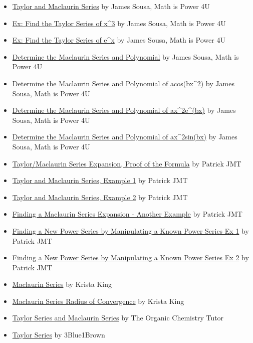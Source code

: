 \begin{itemize}
    \item \href{https://www.youtube.com/watch?v=cwpJxfHkR1o}{Taylor and Maclaurin Series} by James Sousa, Math is Power 4U
    \item \href{https://www.youtube.com/watch?v=jKq-TdR9GG8}{Ex: Find the Taylor Series of x^3} by James Sousa, Math is Power 4U
    \item \href{https://www.youtube.com/watch?v=vzn7EdBQgBk}{Ex: Find the Taylor Series of e^x} by James Sousa, Math is Power 4U
    \item \href{https://www.youtube.com/watch?v=Zt7QQt-3-xA}{Determine the Maclaurin Series and Polynomial} by James Sousa, Math is Power 4U
    \item \href{https://www.youtube.com/watch?v=xgxvpkN-jrU}{Determine the Maclaurin Series and Polynomial of acos(bx^2)} by James Sousa, Math is Power 4U
    \item \href{https://www.youtube.com/watch?v=vdFqHLY6elE}{Determine the Maclaurin Series and Polynomial of ax^2e^(bx)} by James Sousa, Math is Power 4U
    \item \href{https://www.youtube.com/watch?v=TfipAnX2sWs}{Determine the Maclaurin Series and Polynomial of ax^2sin(bx)} by James Sousa, Math is Power 4U
    \item \href{https://www.youtube.com/watch?v=GUtLtRDox3c}{Taylor/Maclaurin Series Expansion, Proof of the Formula} by Patrick JMT
    \item \href{https://www.youtube.com/watch?v=cjPoEZ0I5wQ}{Taylor and Maclaurin Series, Example 1} by Patrick JMT
    \item \href{https://www.youtube.com/watch?v=Os8OtXFBLkY}{Taylor and Maclaurin Series, Example 2} by Patrick JMT
    \item \href{https://www.youtube.com/watch?v=OADFAVC9EgQ}{Finding a Maclaurin Series Expansion - Another Example} by Patrick JMT
    \item \href{https://www.youtube.com/watch?v=jGAWFkLRr3s}{Finding a New Power Series by Manipulating a Known Power Series Ex 1} by Patrick JMT
    \item \href{https://www.youtube.com/watch?v=cT5IXkzcXJQ}{Finding a New Power Series by Manipulating a Known Power Series Ex 2} by Patrick JMT
    \item \href{https://www.youtube.com/watch?v=GJFKLyC48-8}{Maclaurin Series} by Krista King
    \item \href{https://www.youtube.com/watch?v=lv9Kqk7rxJw}{Maclaurin Series Radius of Convergence} by Krista King
    \item \href{https://www.youtube.com/watch?v=LDBnS4c7YbA}{Taylor Series and Maclaurin Series} by The Organic Chemistry Tutor
    \item \href{https://www.youtube.com/watch?v=3d6DsjIBzJ4}{Taylor Series} by 3Blue1Brown
\end{itemize}


